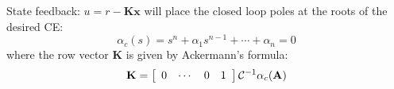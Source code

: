 State feedback: $u=r-\mathbf{K}\mathbf{x}$ will place the closed loop poles at the roots of the desired CE:
\[
\alpha_c(s) = s^n + \alpha_1s^{n-1} + \cdots + \alpha_n = 0
\]
where the row vector $\mathbf{K}$ is given by Ackermann's formula:
\[
\mathbf{K} = 
\left[ {\begin{array}{*{20}c}
   0 &  \cdots  & 0 & 1  \\
\end{array}} \right]
\mathcal{C}^{-1}\alpha_c(\mathbf A)
\]

\endinput

